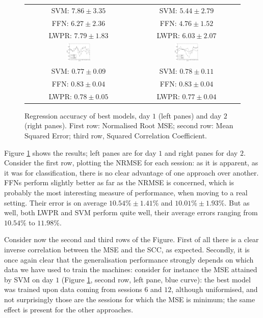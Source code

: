 \begin{figure}[!ht]
\begin{tabular}{cc}
     SVM: $7.86 \pm 3.35$ &  SVM: $5.44 \pm 2.79$ \\
     FFN: $6.27 \pm 2.36$ &  FFN: $4.76 \pm 1.52$ \\
    LWPR: $7.79 \pm 1.83$ & LWPR: $6.03 \pm 2.07$ \\
    \includegraphics[width=0.23\textwidth]{figs/fig_SCC_regr_resCrossBestOnDay1.eps} &
    \includegraphics[width=0.23\textwidth]{figs/fig_SCC_regr_resCrossBestOnDay2.eps} \\
     SVM: $0.77 \pm 0.09$ &  SVM: $0.78 \pm 0.11$ \\
     FFN: $0.83 \pm 0.04$ &  FFN: $0.83 \pm 0.04$ \\
    LWPR: $0.78 \pm 0.05$ & LWPR: $0.77 \pm 0.04$ \\
  \end{tabular}
  \caption{Regression accuracy of best models, day $1$ (left panes)
    and day $2$ (right panes). First row: Normalised Root MSE; second
    row: Mean Squared Error; third row, Squared Correlation Coefficient.}
  \label{fig:best_regr}
\end{figure}

Figure \ref{fig:best_regr} shows the results; left panes are for day
$1$ and right panes for day $2$. Consider the first row, plotting the
NRMSE for each session: as it is apparent, as it was for
classification, there is no clear advantage of one approach over
another. FFNs perform slightly better as far as the NRMSE is concerned,
which is probably the most interesting measure of performance, when
moving to a real setting. Their error is on average $10.54\% \pm
1.41\%$ and $10.01\% \pm 1.93\%$. But as well, both LWPR and SVM
perform quite well, their average errors ranging from $10.54\%$ to
$11.98\%$.

Consider now the second and third rows of the Figure. First of all
there is a clear inverse correlation between the MSE and the SCC, as
expected. Secondly, it is once again clear that the generalisation
performance strongly depends on which data we have used to train the
machines: consider for instance the MSE attained by SVM on day $1$
(Figure \ref{fig:best_regr}, second row, left pane, blue curve): the
best model was trained upon data coming from sessions $6$ and $12$,
although uniformised, and not surprisingly those are the sessions for
which the MSE is minimum; the same effect is present for the other
approaches.

